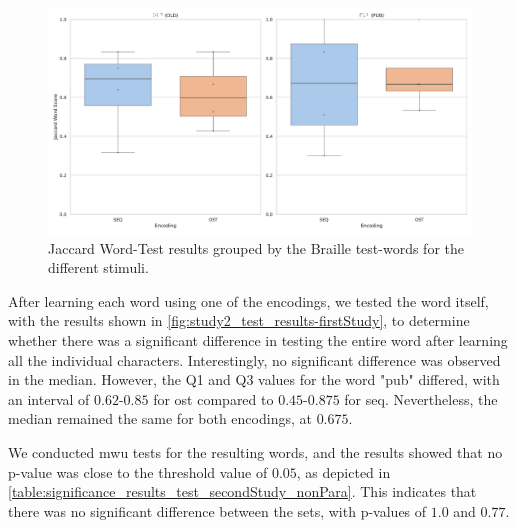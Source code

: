 \begin{figure}
    \centering
    \includegraphics[width=\linewidth]{src/pictures/Study2Data_Experiment/study2_test_results.pdf}
    \caption{Jaccard Word-Test results grouped by the Braille test-words for the different stimuli.}
    \label{fig:study2_test_results-firstStudy}
\end{figure}

After learning each word using one of the encodings, we tested the word itself, with the results shown in \autoref{fig:study2_test_results-firstStudy}, to determine whether there was a significant difference in testing the entire word after learning all the individual characters.
Interestingly, no significant difference was observed in the median. However, the Q1 and Q3 values for the word "pub" differed, with an interval of $0.62$-$0.85$ for \gls{ost} compared to $0.45$-$0.875$ for \gls{seq}.
Nevertheless, the median remained the same for both encodings, at $0.675$.


We conducted \gls{mwu} tests for the resulting words, and the results showed that no p-value was close to the threshold value of $0.05$, as depicted in \autoref{table:significance_results_test_secondStudy_nonPara}. This indicates that there was no significant difference between the sets, with p-values of $1.0$ and $0.77$.



